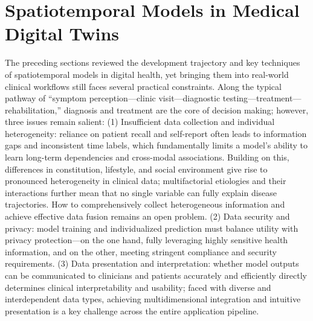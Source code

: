 \documentclass[acmsmall]{acmart}
\begin{document}
\section{Spatiotemporal Models in Medical Digital Twins}
\label{sec:DT}
The preceding sections reviewed the development trajectory and key techniques of spatiotemporal models in digital health, yet bringing them into real-world clinical workflows still faces several practical constraints. Along the typical pathway of “symptom perception—clinic visit—diagnostic testing—treatment—rehabilitation,” diagnosis and treatment are the core of decision making; however, three issues remain salient: (1) Insufficient data collection and individual heterogeneity: reliance on patient recall and self-report often leads to information gaps and inconsistent time labels, which fundamentally limits a model’s ability to learn long-term dependencies and cross-modal associations. Building on this, differences in constitution, lifestyle, and social environment give rise to pronounced heterogeneity in clinical data; multifactorial etiologies and their interactions further mean that no single variable can fully explain disease trajectories. How to comprehensively collect heterogeneous information and achieve effective data fusion remains an open problem. (2) Data security and privacy: model training and individualized prediction must balance utility with privacy protection—on the one hand, fully leveraging highly sensitive health information, and on the other, meeting stringent compliance and security requirements. (3) Data presentation and interpretation: whether model outputs can be communicated to clinicians and patients accurately and efficiently directly determines clinical interpretability and usability; faced with diverse and interdependent data types, achieving multidimensional integration and intuitive presentation is a key challenge across the entire application pipeline.
\end{document}
